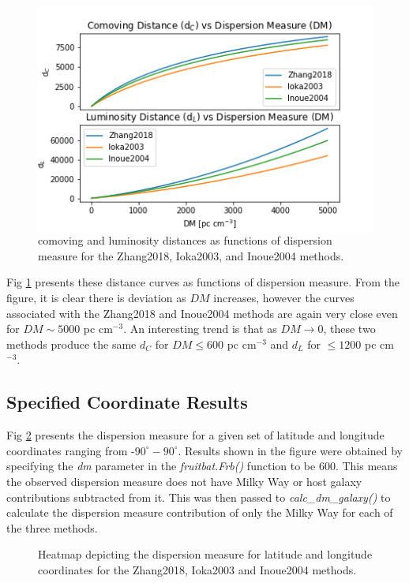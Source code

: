 \documentclass{article}
\begin{document}
\begin{figure}[!htb]
\includegraphics[width=\linewidth]{distance_vs_DM.png}
\caption{comoving and luminosity distances as functions of dispersion measure for the Zhang2018, Ioka2003, and Inoue2004 methods. }
\label{fig:distance_v_DM}
\end{figure}

Fig \ref{fig:distance_v_DM} presents these distance curves as functions of dispersion measure. From the figure, it is clear there is deviation as $DM$ increases, however the curves associated with the Zhang2018 and Inoue2004 methods are again very close even for $DM\sim5000$ pc cm$^{-3}$. An interesting trend is that as $DM\rightarrow0$,  these two methods produce the same $d_C$ for $DM \leqslant 600$ pc cm$^{-3}$ and $d_L$ for $\leqslant 1200$ pc cm$^{-3}$.

\subsection{Specified Coordinate Results}

Fig \ref{fig:heatmapDM} presents the dispersion measure for a given set of latitude and longitude coordinates ranging from -$90^\circ-90^\circ$. Results shown in the figure were obtained by specifying the \emph{dm} parameter in the \emph{fruitbat.Frb()} function to be 600. This means the observed dispersion measure does not have Milky Way or host galaxy contributions subtracted from it. This was then passed to \emph{calc\_dm\_galaxy()} to calculate the dispersion measure contribution of only the Milky Way for each of the three methods.

\begin{figure}[!htb]
\centering
{}\hfill
{}\par 
{}
\caption{Heatmap depicting the dispersion measure for latitude and longitude coordinates for the Zhang2018, Ioka2003 and Inoue2004 methods.}
\label{fig:heatmapDM}
\end{figure}
\end{document}
